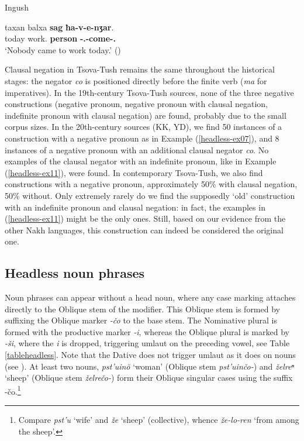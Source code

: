 \begin{exe}
	\ex\label{headless-ex12}
	Ingush
    
	\gll taxan balxa \textbf{sag} \textbf{ħa-v-e-nʒar}. \\
	today work.{\Lat} \textbf{person} \textbf{{\Pv}-{\M}.{\Sg}-come-{\Neg}.{\Pst}} \\
	\trans `Nobody came to work today.'
	\hfill (\cite[696]{nichols11})
\end{exe}

Clausal negation in Tsova-Tush remains the same throughout the historical stages: the negator \textit{co} is positioned directly before the finite verb (\textit{ma} for imperatives).
In the 19th-century Tsova-Tush sources, none of the three negative constructions (negative pronoun, negative pronoun with clausal negation, indefinite pronoun with clausal negation) are found, probably due to the small corpus sizes. 
In the 20th-century sources (KK, YD), we find 50 instances of a construction with a negative pronoun as in Example (\ref{headless-ex07}), and 8 instances of a negative pronoun with an additional clausal negator \textit{co}. No examples of the clausal negator with an indefinite pronoun, like in Example (\ref{headless-ex11}), were found. In contemporary Tsova-Tush, we also find constructions with a negative pronoun, approximately 50\% with clausal negation, 50\% without. Only extremely rarely do we find the supposedly `old' construction with an indefinite pronoun and clausal negation: in fact, the examples in (\ref{headless-ex11}) might be the only ones. Still, based on our evidence from the other Nakh languages, this construction can indeed be considered the original one.



\subsection{Headless noun phrases} \label{subst}

Noun phrases can appear without a head noun, where any case marking attaches directly to the Oblique stem of the modifier. This Oblique stem is formed by suffixing the Oblique marker \textit{-čo} to the base stem. The Nominative plural is formed with the productive marker \textit{-i}, whereas the Oblique plural is marked by \textit{-ši}, where the \textit{i} is dropped, triggering umlaut on the preceding vowel, see Table \ref{tableheadless}. Note that the Dative does not trigger umlaut as it does on nouns (see ).
At least two nouns, \textit{pst'uin\u{o}} `woman' (Oblique stem \textit{pst'uinčo-}) and \textit{želreⁿ} `sheep' (Oblique stem \textit{želrečo-}) form their Oblique singular cases using the suffix {-čo}.\footnote{Compare \textit{pst'u} `wife' and \textit{že} `sheep' (collective), whence \textit{že-lo-ren} `from among the sheep'.} 

